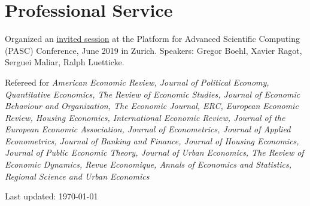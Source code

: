 \documentclass[letterpaper]{article}
\renewenvironment{itemize}{
  \begin{list}{}{
    \setlength{\leftmargin}{1.5em}
  }
}{
  \end{list}
}
\begin{document}
\section*{Professional Service}

\begin{itemize}
\item Organized an \href{https://pasc19.pasc-conference.org/program/schedule/session/?sess=sess124}{invited session} at the Platform for Advanced Scientific Computing (PASC) Conference, June 2019 in Zurich. Speakers: Gregor Boehl, Xavier Ragot, Serguei Maliar, Ralph Luetticke.
\item Refereed for {\it American Economic Review, Journal of Political Economy, Quantitative Economics, The Review of Economic Studies, Journal of Economic Behaviour and Organization, The Economic Journal, ERC, European Economic Review, Housing Economics, International Economic Review, Journal of the European Economic Association, Journal of Econometrics, Journal of Applied Econometrics, Journal of Banking and Finance, Journal of Housing Economics, Journal of Public Economic Theory, Journal of Urban Economics, The Review of Economic Dynamics, Revue Economique, Annals of Economics and Statistics, Regional Science and Urban Economics}
\end{itemize}

\bigskip

\begin{center}
  \begin{footnotesize}
    Last updated: \today \\
  \end{footnotesize}
\end{center}
\end{document}
